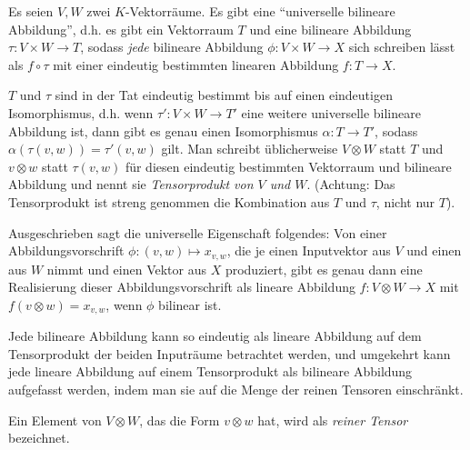 \begin{theoremdef}\label{tensorprodukt:def}
Es seien $V,W$ zwei $K$-Vektorräume. Es gibt eine \enquote{universelle bilineare Abbildung}, d.h. es gibt ein Vektorraum $T$ und eine bilineare Abbildung $\tau: V\times W\to T$, sodass \textit{jede} bilineare Abbildung $\phi: V\times W \to X$ sich schreiben lässt als $f\circ\tau$ mit einer eindeutig bestimmten linearen Abbildung $f: T\to X$.


\medbreak
$T$ und $\tau$ sind in der Tat eindeutig bestimmt bis auf einen eindeutigen Isomorphismus, d.h. wenn $\tau':V\times W\to T'$ eine weitere universelle bilineare Abbildung ist, dann gibt es genau einen Isomorphismus $\alpha:T\to T'$, sodass $\alpha(\tau(v,w)) = \tau'(v,w)$ gilt. Man schreibt üblicherweise $V\otimes W$ statt $T$ und $v\otimes w$ statt $\tau(v,w)$ für diesen eindeutig bestimmten Vektorraum und bilineare Abbildung und nennt sie \emph{Tensorprodukt von $V$ und $W$}. (Achtung: Das Tensorprodukt ist streng genommen die Kombination aus $T$ und $\tau$, nicht nur $T$).
\end{theoremdef}

\begin{remark}
Ausgeschrieben sagt die universelle Eigenschaft folgendes: Von einer Abbildungsvorschrift $\phi: (v,w) \mapsto x_{v,w}$, die je einen Inputvektor aus $V$ und einen aus $W$ nimmt und einen Vektor aus $X$ produziert, gibt es genau dann eine Realisierung dieser Abbildungsvorschrift als lineare Abbildung $f: V\otimes W\to X$ mit $f(v\otimes w) = x_{v,w}$, wenn $\phi$ bilinear ist.

Jede bilineare Abbildung kann so eindeutig als lineare Abbildung auf dem Tensorprodukt der beiden Inputräume betrachtet werden, und umgekehrt kann jede lineare Abbildung auf einem Tensorprodukt als bilineare Abbildung aufgefasst werden, indem man sie auf die Menge der reinen Tensoren einschränkt.
\end{remark}

\begin{definition}\label{tensoren:reine_tensoren}
Ein Element von $V\otimes W$, das die Form $v\otimes w$ hat, wird als \emph{reiner Tensor} bezeichnet.
\end{definition}


